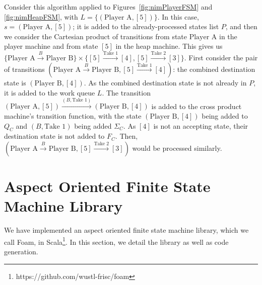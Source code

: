 \documentclass[sigplan,anonymous, review]{acmart}
\begin{document}
Consider this algorithm applied to Figures~\ref{fig:nimPlayerFSM} and \ref{fig:nimHeapFSM}, with $L = \{(\text{Player A}, [5])\}$. In this case, $s = (\text {Player A}, [5])$; it is added to the already-processed states list $P$, and then we consider the Cartesian product of transitions from state $\text{Player A}$ in the player machine and from state $[5]$ in the heap machine. This gives us $\{\text{Player A} \xrightarrow{B} \text{Player B}\} \times \{[5] \xrightarrow{\text{Take } 1} [4], [5] \xrightarrow{\text{Take } 2} [3]\}$. First consider the pair of transitions $(\text{Player A} \xrightarrow{B} \text{Player B}, [5] \xrightarrow{\text{Take } 1} [4])$: the combined destination state is $(\text{Player B}, [4])$. As the combined destination state is not already in $P$, it is added to the work queue $L$. The transition $(\text {Player A}, [5]) \xrightarrow{(B, \text{Take } 1)} (\text{Player B}, [4])$ is added to the cross product machine's transition function, with the state $(\text{Player B}, [4])$ being added to $Q_C$ and $(B, \text{Take } 1)$ being added $\Sigma_C$. As $[4]$ is not an accepting state, their destination state is not added to $F_C$. Then, $(\text{Player A} \xrightarrow{B} \text{Player B}, [5] \xrightarrow{\text{Take } 2} [3])$ would be processed similarly. 





\section{Aspect Oriented Finite State Machine Library}\label{sec:foam}
We have implemented an aspect oriented finite state machine library, which we call Foam,  in Scala\footnote{https://github.com/wustl-frisc/foam}. In this section, we detail the library as well as code generation.
\end{document}
